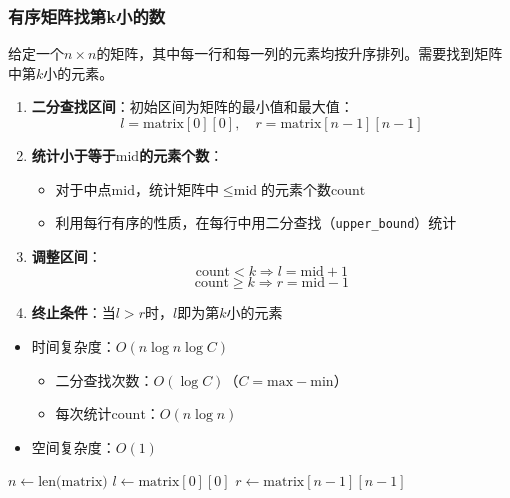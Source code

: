 \documentclass[./../main.tex]{subfiles}
\begin{document}
\subsubsection{有序矩阵找第k小的数}

给定一个$n \times n$的矩阵，其中每一行和每一列的元素均按升序排列。需要找到矩阵中第$k$小的元素。

\begin{enumerate}
    \item \textbf{二分查找区间}：初始区间为矩阵的最小值和最大值：
        $$
        l = \text{matrix}[0][0], \quad r = \text{matrix}[n-1][n-1]
        $$
    \item \textbf{统计小于等于$\text{mid}$的元素个数}：
        \begin{itemize}
            \item 对于中点$\text{mid}$，统计矩阵中$\leq \text{mid}$的元素个数$\text{count}$
            \item 利用每行有序的性质，在每行中用二分查找（\texttt{upper\_bound}）统计
        \end{itemize}
    \item \textbf{调整区间}：
        $$
        \text{count} < k \Rightarrow l = \text{mid} + 1
        $$
        $$
        \text{count} \geq k \Rightarrow r = \text{mid} - 1
        $$
    \item \textbf{终止条件}：当$l > r$时，$l$即为第$k$小的元素
\end{enumerate}

\begin{itemize}
    \item 时间复杂度：$O(n \log n \log C)$
        \begin{itemize}
            \item 二分查找次数：$O(\log C)$（$C = \text{max} - \text{min}$）
            \item 每次统计$\text{count}$：$O(n \log n)$
        \end{itemize}
    \item 空间复杂度：$O(1)$
\end{itemize}

\begin{algorithm}[h]
\caption{Find K-th Smallest Element in Sorted Matrix}


$n \gets \text{len(matrix)}$\;
$l \gets \text{matrix}[0][0]$\;
$r \gets \text{matrix}[n-1][n-1]$\;


\;
\end{algorithm}
\end{document}
